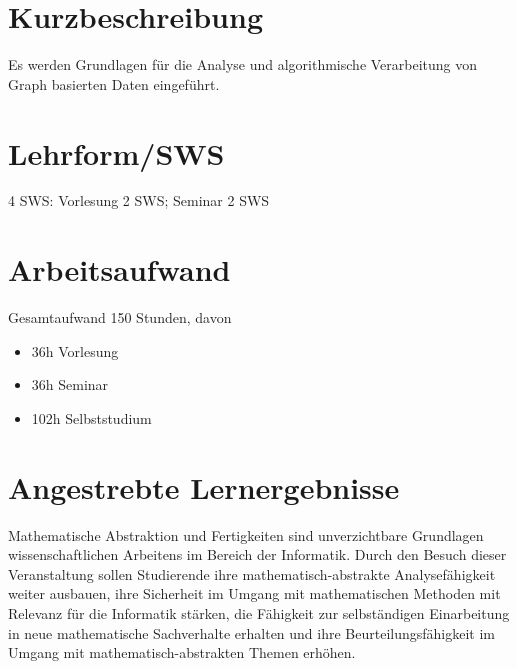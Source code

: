 \section*{Kurzbeschreibung\label{/mi-2017/modulbeschreibungen-master/MA_All_Modul_Mathematik}}\label{kurzbeschreibungpathlabelmi-2017modulbeschreibungen-mastermaux5fallux5fmodulux5fmathematik}

Es werden Grundlagen für die Analyse und algorithmische Verarbeitung von
Graph basierten Daten eingeführt.

\section*{Lehrform/SWS
\label{/mi-2017/modulbeschreibungen-master/MA_All_Modul_Mathematik}}\label{lehrformsws-pathlabelmi-2017modulbeschreibungen-mastermaux5fallux5fmodulux5fmathematik}

4 SWS: Vorlesung 2 SWS; Seminar 2 SWS

\section*{Arbeitsaufwand
\label{/mi-2017/modulbeschreibungen-master/MA_All_Modul_Mathematik}}\label{arbeitsaufwand-pathlabelmi-2017modulbeschreibungen-mastermaux5fallux5fmodulux5fmathematik}

Gesamtaufwand 150 Stunden, davon

\begin{itemize}
\tightlist
\item
  36h Vorlesung
\item
  36h Seminar
\item
  102h Selbststudium
\end{itemize}

\section*{Angestrebte
Lernergebnisse\label{/mi-2017/modulbeschreibungen-master/MA_All_Modul_Mathematik}}\label{angestrebte-lernergebnissepathlabelmi-2017modulbeschreibungen-mastermaux5fallux5fmodulux5fmathematik}

Mathematische Abstraktion und Fertigkeiten sind unverzichtbare
Grundlagen wissenschaftlichen Arbeitens im Bereich der Informatik. Durch
den Besuch dieser Veranstaltung sollen Studierende ihre
mathematisch-abstrakte Analysefähigkeit weiter ausbauen, ihre Sicherheit
im Umgang mit mathematischen Methoden mit Relevanz für die Informatik
stärken, die Fähigkeit zur selbständigen Einarbeitung in neue
mathematische Sachverhalte erhalten und ihre Beurteilungsfähigkeit im
Umgang mit mathematisch-abstrakten Themen erhöhen.

